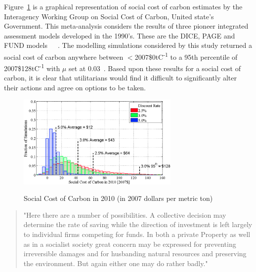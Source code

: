 \documentclass[11pt, oneside]{article}   	%
\begin{document}
Figure~\ref{USA SCC figure} is a graphical representation of social cost of carbon estimates by the Interagency Working Group on Social Cost of Carbon, United state's Government. This meta-analysis considers the results of three pioneer integrated assessment models developed in the 1990's. These are the DICE, PAGE and FUND models~\cite{wn1}~\cite{ch1}~\cite{rsjt1}. The modelling simulations considered by this study returned a social cost of carbon anywhere between $<$2007\$0tC\textsuperscript{-1} to a 95th percentile of 2007\$128tC\textsuperscript{-1} with $\mu$ set at 0.03~\cite{iwg1}. Based upon these results for a social cost of carbon, it is clear that utilitarians would find it difficult to significantly alter their actions and agree on options to be taken. 

\begin{figure}[h]
\caption{Social Cost of Carbon in 2010 (in 2007 dollars per metric ton)}
\centering
\includegraphics[width=0.7\textwidth]{scc}
\label{USA SCC figure}
\end{figure}

\begin{quote}
"Here there are a number of possibilities. A collective decision may determine the rate of saving while the direction of investment is left largely to individual firms competing for funds. In both a private Property as well as in a socialist society great concern may be expressed for preventing irreversible damages and for husbanding natural resources and preserving the environment. But again either one may do rather badly."~\cite{jr1}
\end{quote}
\end{document}

